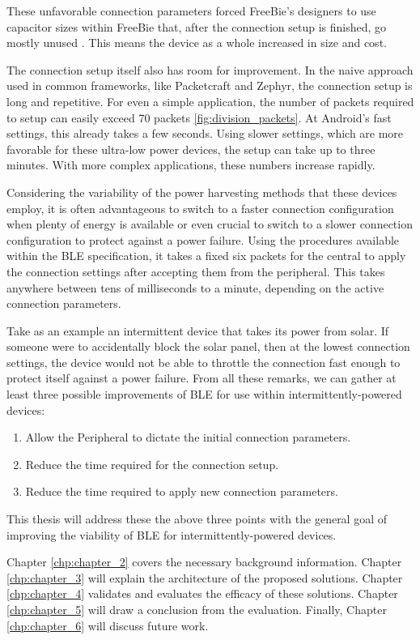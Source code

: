 These unfavorable connection parameters forced FreeBie's designers to use capacitor sizes within FreeBie that, after the connection setup is finished, go mostly unused \cite{freebie}. This means the device as a whole increased in size and cost. 

The connection setup itself also has room for improvement. In the naive approach used in common frameworks, like Packetcraft and Zephyr, the connection setup is long and repetitive. For even a simple application, the number of packets required to setup can easily exceed 70 packets \ref{fig:division_packets}. At Android's fast settings, this already takes a few seconds. Using slower settings, which are more favorable for these ultra-low power devices, the setup can take up to three minutes. With more complex applications, these numbers increase rapidly.

Considering the variability of the power harvesting methods that these devices employ, it is often advantageous to switch to a faster connection configuration when plenty of energy is available or even crucial to switch to a slower connection configuration to protect against a power failure. Using the procedures available within the BLE specification, it takes a fixed six packets for the central to apply the connection settings after accepting them from the peripheral. This takes anywhere between tens of milliseconds to a minute, depending on the active connection parameters. 

Take as an example an intermittent device that takes its power from solar. If someone were to accidentally block the solar panel, then at the lowest connection settings, the device would not be able to throttle the connection fast enough to protect itself against a power failure. From all these remarks, we can gather at least three possible improvements of BLE for use within intermittently-powered devices:
\begin{enumerate}
    \item Allow the Peripheral to dictate the initial connection parameters.
    \item Reduce the time required for the connection setup.
    \item Reduce the time required to apply new connection parameters.
\end{enumerate}
This thesis will address these the above three points with the general goal of improving the viability of BLE for intermittently-powered devices.

Chapter \ref*{chp:chapter_2} covers the necessary background information. Chapter \ref*{chp:chapter_3} will explain the architecture of the proposed solutions. Chapter \ref*{chp:chapter_4} validates and evaluates the efficacy of these solutions. Chapter \ref{chp:chapter_5} will draw a conclusion from the evaluation. Finally, Chapter \ref{chp:chapter_6} will discuss future work.
